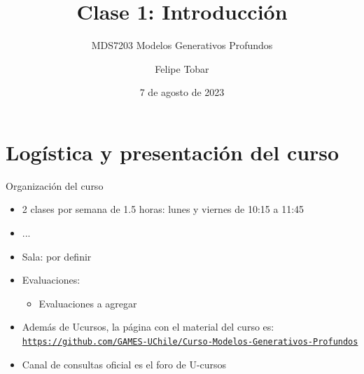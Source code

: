 \documentclass[9pt]{beamer}
\title{Clase 1: Introducción}
\subtitle{MDS7203 Modelos Generativos Profundos}
\date{7 de agosto de 2023}
\author{Felipe Tobar}
\institute{Iniciativa de Datos e Inteligencia Artificial\\Universidad de Chile}
\begin{document}
\begin{frame}
  \titlepage
\end{frame}

\section{Logística y presentación del curso}
\begin{frame}{Organización del curso}

\begin{itemize}
  \item 2 clases por semana de 1.5 horas: lunes y viernes de 10:15 a 11:45 
  \item ...
  \item Sala: por definir
  \item Evaluaciones: 
  \begin{itemize}
    \item Evaluaciones a agregar
  \end{itemize}
  \item Además de Ucursos, la página con el material del curso es: \href{https://github.com/GAMES-UChile/Curso-Modelos-Generativos-Profundos}{\tt https://github.com/GAMES-UChile/Curso-Modelos-Generativos-Profundos}
  \item Canal de consultas oficial es el foro de U-cursos
\end{itemize}

\end{frame}



% 
\end{document}
